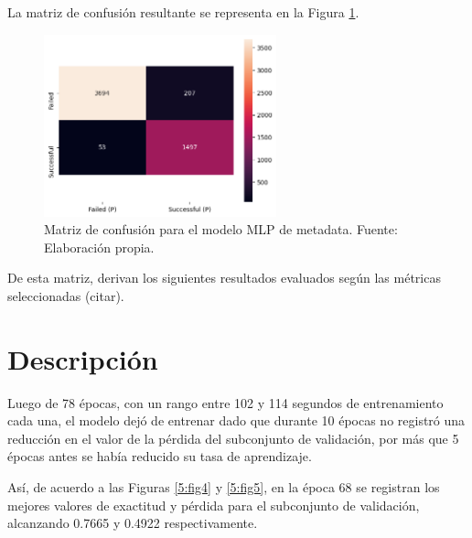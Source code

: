 La matriz de confusión resultante se representa en la Figura \ref{5:fig3}.

\begin{figure}[!ht]
	\begin{center}
		\includegraphics[width=0.60\textwidth]{4/figures/metadata_confusion_matrix.png}
		\caption{Matriz de confusión para el modelo MLP de metadata. Fuente: Elaboración propia.}
		\label{5:fig3}
	\end{center}
\end{figure}

De esta matriz, derivan los siguientes resultados evaluados según las métricas seleccionadas (citar).

\section{Descripción}
Luego de 78 épocas, con un rango entre 102 y 114 segundos de entrenamiento cada una, el modelo dejó de entrenar dado que durante 10 épocas no registró una reducción en el valor de la pérdida del subconjunto de validación, por más que 5 épocas antes se había reducido su tasa de aprendizaje.

Así, de acuerdo a las Figuras \ref{5:fig4} y \ref{5:fig5}, en la época 68 se registran los mejores valores de exactitud y pérdida para el subconjunto de validación, alcanzando 0.7665 y 0.4922 respectivamente.


